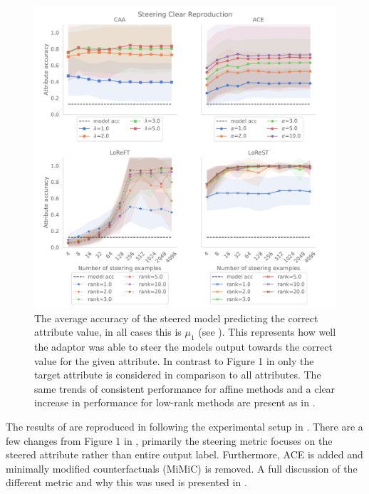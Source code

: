 \begin{figure}
    \centering
    \captionsetup{width=\textwidth}
    \includegraphics[width=\textwidth]{figures/steering_clear.pdf}
    \caption{
        The average accuracy of the steered model predicting the correct attribute value, in all cases this is $\mu_1$ (see ).
        This represents how well the adaptor was able to steer the models output towards the correct value for the given attribute.
        In contrast to Figure 1 in \citet{steering-clear} only the target attribute is considered in comparison to all attributes.
        The same trends of consistent performance for affine methods and a clear increase in performance for low-rank methods are present as in \citet{steering-clear}.
    }
    \label{fig:steering-clear}
\end{figure}

The results of \cite{steering-clear} are reproduced in  following the experimental setup in .
There are a few changes from Figure 1 in \cite{steering-clear}, primarily the steering metric focuses on the steered attribute rather than entire output label.
Furthermore, ACE is added and minimally modified counterfactuals (MiMiC) \citep{mimic} is removed.
A full discussion of the different metric and why this was used is presented in .

